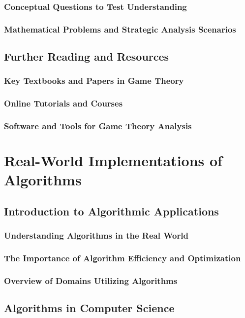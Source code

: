 \documentclass[12pt]{book} %
\begin{document}
\subsection{Conceptual Questions to Test Understanding}
\subsection{Mathematical Problems and Strategic Analysis Scenarios}

\section{Further Reading and Resources}
\subsection{Key Textbooks and Papers in Game Theory}
\subsection{Online Tutorials and Courses}
\subsection{Software and Tools for Game Theory Analysis}

\chapter{Real-World Implementations of Algorithms}

\section{Introduction to Algorithmic Applications}
\subsection{Understanding Algorithms in the Real World}
\subsection{The Importance of Algorithm Efficiency and Optimization}
\subsection{Overview of Domains Utilizing Algorithms}

\section{Algorithms in Computer Science}
\end{document}
